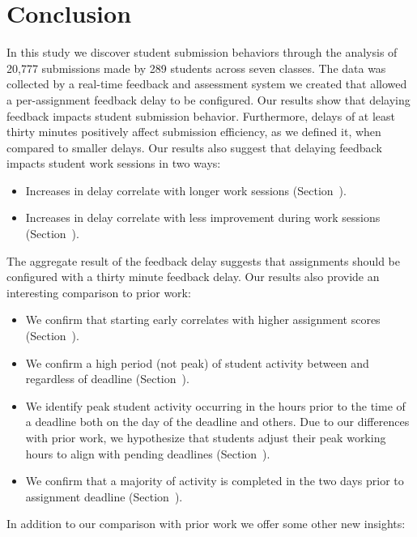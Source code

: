 \section{Conclusion} 
In this study we discover student submission behaviors through the analysis of
20,777 submissions made by 289 students across seven classes. The data was
collected by a real-time feedback and assessment system we created that allowed
a per-assignment feedback delay to be configured. Our results show that
delaying feedback impacts student submission behavior. Furthermore, delays of
at least thirty minutes positively affect submission efficiency, as we defined
it, when compared to smaller delays. Our results also suggest that delaying
feedback impacts student work sessions in two ways:

\begin{itemize}
\item Increases in delay correlate with longer work sessions
  (Section~).
\item Increases in delay correlate with less improvement during work sessions
  (Section~).
\end{itemize}

The aggregate result of the feedback delay suggests that assignments should be
configured with a thirty minute feedback delay. Our results also provide an
interesting comparison to prior work:

\begin{itemize}
\item We confirm that starting early correlates with higher assignment
  scores (Section~).
\item We confirm a high period (not peak) of student activity between 
  and  regardless of deadline (Section~).
\item We identify peak student activity occurring in the hours prior to the
  time of a deadline both on the day of the deadline and others. Due to our
  differences with prior work, we hypothesize that students adjust their peak
  working hours to align with pending deadlines (Section~).
\item We confirm that a majority of activity is completed in the two days prior
  to assignment deadline (Section~).
\end{itemize}

In addition to our comparison with prior work we offer some other new insights:

